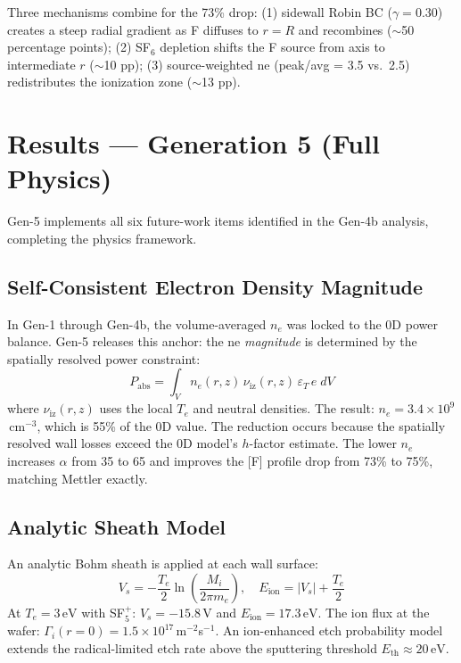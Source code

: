 \documentclass[11pt,a4paper]{article}
\renewcommand{\ne}{n_e}
\newcommand{\Te}{T_e}
\newcommand{\eV}{\,\mathrm{eV}}
\begin{document}
Three mechanisms combine for the 73\% drop: (1) sidewall Robin BC ($\gamma=0.30$) creates a steep radial gradient as F diffuses to $r=R$ and recombines ($\sim$50 percentage points); (2) SF$_6$ depletion shifts the F source from axis to intermediate $r$ ($\sim$10 pp); (3) source-weighted ne (peak/avg = 3.5 vs.\ 2.5) redistributes the ionization zone ($\sim$13 pp).

\section{Results --- Generation 5 (Full Physics)}
\label{sec:gen5}

Gen-5 implements all six future-work items identified in the Gen-4b analysis, completing the physics framework.

\subsection{Self-Consistent Electron Density Magnitude}

In Gen-1 through Gen-4b, the volume-averaged $\ne$ was locked to the 0D power balance.  Gen-5 releases this anchor: the ne \emph{magnitude} is determined by the spatially resolved power constraint:
\begin{equation}
P_{\mathrm{abs}} = \int_V \ne(r,z)\,\nu_{\mathrm{iz}}(r,z)\,\varepsilon_T\,e\;dV
\end{equation}
where $\nu_{\mathrm{iz}}(r,z)$ uses the local $\Te$ and neutral densities.  The result: $\ne = 3.4\times10^9$\,cm$^{-3}$, which is 55\% of the 0D value.  The reduction occurs because the spatially resolved wall losses exceed the 0D model's $h$-factor estimate.  The lower $\ne$ increases $\alpha$ from 35 to 65 and improves the [F] profile drop from 73\% to 75\%, matching Mettler exactly.

\subsection{Analytic Sheath Model}

An analytic Bohm sheath is applied at each wall surface:
\begin{equation}
V_s = -\frac{\Te}{2}\ln\!\left(\frac{M_i}{2\pi m_e}\right), \quad E_{\mathrm{ion}} = |V_s| + \frac{\Te}{2}
\end{equation}
At $\Te = 3\eV$ with SF$_5^+$: $V_s = -15.8$\,V and $E_{\mathrm{ion}} = 17.3\eV$.  The ion flux at the wafer: $\Gamma_i(r=0) = 1.5\times10^{17}$\,m$^{-2}$s$^{-1}$.  An ion-enhanced etch probability model extends the radical-limited etch rate above the sputtering threshold $E_{\mathrm{th}} \approx 20\eV$.
\end{document}
